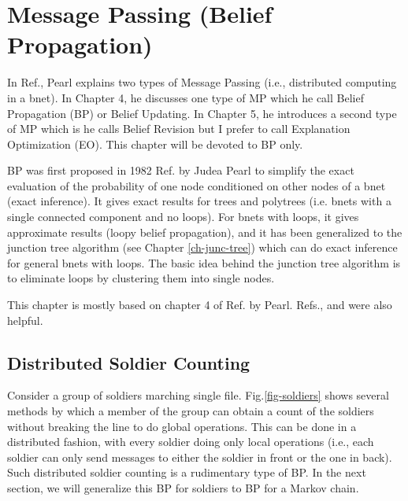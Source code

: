 \chapter{Message Passing
(Belief Propagation)}\label{ch-mp}

In Ref.\cite{pearl1982reverend},
Pearl explains two types 
of Message Passing (i.e., distributed 
computing in a bnet). In Chapter 4, he discusses
one type of MP which he call Belief Propagation (BP)
or Belief Updating. In Chapter 5, he introduces
a second type of MP which is he calls Belief Revision but
I prefer to call
Explanation Optimization (EO).
This chapter will be devoted to BP only.

BP
was first proposed in 1982
Ref.\cite{pearl1982reverend} by Judea Pearl
to simplify
the exact evaluation of the probability
of one node conditioned 
on other nodes
of a bnet (exact inference).
It gives exact results for trees and
polytrees (i.e. bnets with
a single connected component and
 no
loops). For bnets with loops,
it gives approximate results
(loopy belief propagation),
and it has been generalized to
the junction tree algorithm
(see Chapter \ref{ch-junc-tree})
which can do exact inference
for general bnets with loops.
The basic idea behind
the junction tree algorithm
is to eliminate
loops by clustering
them into single nodes.

This chapter is mostly
based on chapter 4 of 
Ref.\cite{pearl-1988book}
by Pearl.
Refs.\cite{wiki-mp},
and \cite{neapolitan2004learning}
were also helpful.

\section*{Distributed Soldier Counting}
Consider
a group of soldiers marching single file.
Fig.\ref{fig-soldiers}
shows several methods by which 
a member of the group 
can obtain a count 
of the soldiers without
breaking the line to do 
global operations.
This can be done in
a distributed fashion, 
with every soldier doing
only local operations
(i.e.,
each soldier 
can only 
send
messages
to either
the soldier in front
or the one in
back).
Such 
distributed soldier counting is a rudimentary
type of BP.
In the next section,
we will
generalize this BP for soldiers
to BP for a Markov chain.
\newpage


